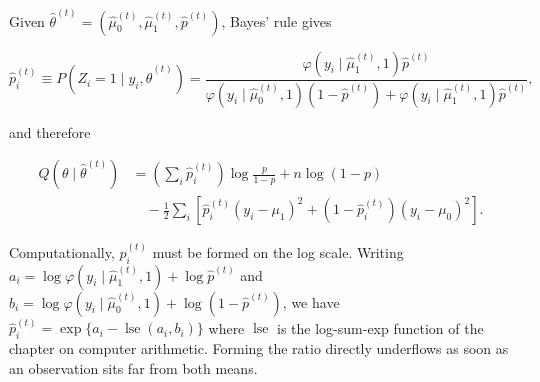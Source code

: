 \documentclass[
  letterpaper,
  DIV=11,
  numbers=noendperiod]{scrreprt}
\begin{document}
Given
\(\hat\theta^{(t)} = (\hat\mu_0^{(t)}, \hat\mu_1^{(t)}, \hat p^{(t)})\),
Bayes' rule gives

\[
\hat p_i^{(t)} \equiv P\!\left(Z_i = 1 \mid y_i, \hat\theta^{(t)}\right)
= \frac{\varphi\!\left(y_i \mid \hat\mu_1^{(t)}, 1\right) \hat p^{(t)}}
       {\varphi\!\left(y_i \mid \hat\mu_0^{(t)}, 1\right)\!\left(1 - \hat p^{(t)}\right)
        + \varphi\!\left(y_i \mid \hat\mu_1^{(t)}, 1\right) \hat p^{(t)}} ,
\]

and therefore

\[
\begin{aligned}
Q\!\left(\theta \mid \hat\theta^{(t)}\right)
&= \left(\sum_i \hat p_i^{(t)}\right) \log \frac{p}{1-p} + n \log(1-p) \\
&\quad - \frac{1}{2}\sum_i \left[\hat p_i^{(t)} (y_i - \mu_1)^2 + \left(1 - \hat p_i^{(t)}\right)(y_i - \mu_0)^2\right] .
\end{aligned}
\]

Computationally, \(\hat p_i^{(t)}\) must be formed on the log scale.
Writing
\(a_i = \log \varphi(y_i \mid \hat\mu_1^{(t)}, 1) + \log \hat p^{(t)}\)
and
\(b_i = \log \varphi(y_i \mid \hat\mu_0^{(t)}, 1) + \log(1 - \hat p^{(t)})\),
we have \(\hat p_i^{(t)} = \exp\{a_i - \operatorname{lse}(a_i, b_i)\}\)
where \(\operatorname{lse}\) is the log-sum-exp function of the chapter
on computer arithmetic. Forming the ratio directly underflows as soon as
an observation sits far from both means.
\end{document}

